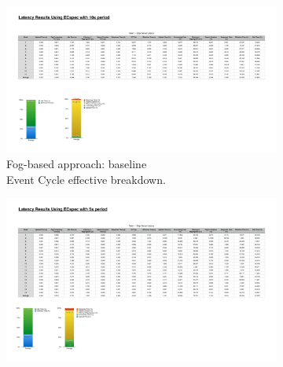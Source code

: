 \begin{figure}[ht!]
  \centering
  \begin{subfigure}{.5\textwidth}
    \centering
    \includegraphics[height=\linewidth]{./images/edge_ecspec_effective_breakdown}
    \caption{Fog-based approach: baseline\\Event Cycle effective breakdown.}
    \label{fig:ecspec_effective_base}
  \end{subfigure}%
  \begin{subfigure}{.5\textwidth}
    \centering
    \includegraphics[height=\linewidth]{./images/edge_ecspecf_effective_breakdown}

\end{subfigure}
\end{figure}

